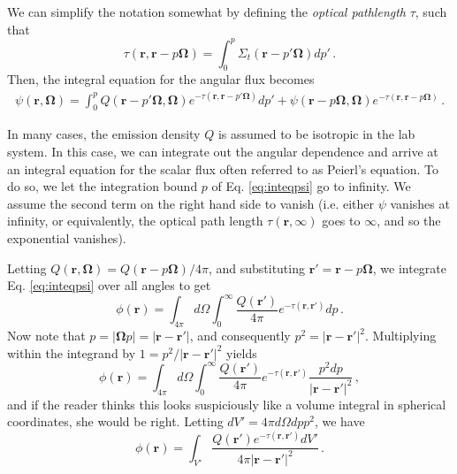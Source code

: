 We can simplify the notation somewhat by defining the \textit{optical pathlength} $\tau$, such that
\begin{equation}
  \tau ( \mathbf{r} ,\mathbf{r} -p \mathbf{\Omega} ) = \int^p_0 \Sigma_t(\mathbf{r} -p'\mathbf{\Omega}) dp' \, . 
  \label{eq:opticalpathlength}
\end{equation}
Then, the integral equation for the angular flux becomes
\begin{equation}
  \begin{split}
    \psi(\mathbf{r},\mathbf{\Omega}) = \int^p_0 Q(\mathbf{r} -p'\mathbf{\Omega},\mathbf{\Omega})e^{-\tau(\mathbf{r},\mathbf{r}-p'\mathbf{\Omega})}dp'                         +  \psi(\mathbf{r} - p\mathbf{\Omega},\mathbf{\Omega})e^{ -\tau(\mathbf{r},\mathbf{r}-p\mathbf{\Omega}) }   \, .
  \end{split}
  \label{eq:inteqpsi}
\end{equation}

In many cases, the emission density $Q$ is assumed to be isotropic in the lab system.  In this case, we can integrate out the angular dependence and arrive at an integral equation for the scalar flux often referred to as Peierl's equation.  To do so, we let the integration bound $p$ of Eq. \ref{eq:inteqpsi} go to infinity.  We assume the second term on the right hand side to vanish (i.e. either $\psi$ vanishes at infinity, or equivalently, the optical path length $\tau(\mathbf{r},\infty)$ goes to $\infty$, and so the exponential vanishes).  

Letting $Q(\mathbf{r},\mathbf{\Omega}) = Q(\mathbf{r} -p\mathbf{\Omega})/4\pi$, and substituting $\mathbf{r}' = \mathbf{r} - p \mathbf{\Omega}$, we integrate Eq. \ref{eq:inteqpsi} over all angles to get
\begin{equation}
 \phi(\mathbf{r}) = \int_{4\pi} d\Omega \int^{\infty}_0  \frac{Q(\mathbf{r}')}{4\pi}e^{-\tau(\mathbf{r},\mathbf{r}')}dp \, .
 \label{eq:integralphiPRE}
\end{equation}
Now note that $p =|\mathbf{\Omega} p|=|\mathbf{r}-\mathbf{r}'|$, and consequently $p^2 = |\mathbf{r}-\mathbf{r}'|^2$.  Multiplying within the integrand by $1=p^2/|\mathbf{r}-\mathbf{r}'|^2$ yields
\begin{equation}
 \phi(\mathbf{r}) = \int_{4\pi} d\Omega \int^{\infty}_0  \frac{Q(\mathbf{r}')}{4\pi}e^{-\tau(\mathbf{r},\mathbf{r}')}\frac{p^2dp}{|\mathbf{r}-\mathbf{r}'|^2} \, ,
\end{equation}
and if the reader thinks this looks suspiciously like a volume integral in spherical coordinates, she would be right.  Letting $dV' = 4\pi d\Omega dpp^2$, we have
\begin{equation}
 \phi(\mathbf{r}) = \int_{V'} \frac{ Q(\mathbf{r}')e^{-\tau(\mathbf{r},\mathbf{r}')} dV'}{4\pi|\mathbf{r}-\mathbf{r}'|^2} \, .
 \label{eq:integralphi}
\end{equation}

